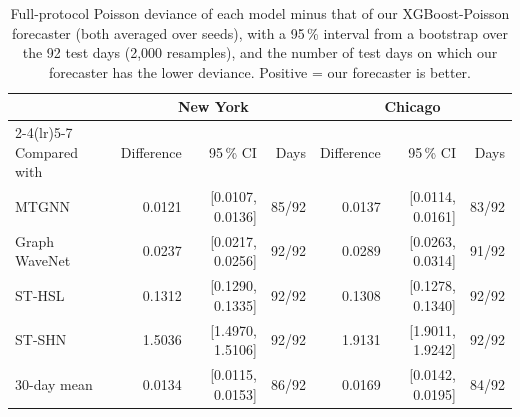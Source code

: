 \begin{table}[!htbp]\centering\small\setlength{\tabcolsep}{3.5pt}
\caption{Full-protocol Poisson deviance of each model minus that of our XGBoost-Poisson forecaster (both averaged over seeds), with a 95\,\% interval from a bootstrap over the 92 test days (2{,}000 resamples), and the number of test days on which our forecaster has the lower deviance. Positive = our forecaster is better.}\label{tab:bootstrap}
\begin{tabular}{lrrrrrr}\toprule
 & \multicolumn{3}{c}{New York} & \multicolumn{3}{c}{Chicago}\\\cmidrule(lr){2-4}\cmidrule(lr){5-7}
Compared with & Difference & 95\,\% CI & Days & Difference & 95\,\% CI & Days\\\midrule
MTGNN & 0.0121 & [0.0107, 0.0136] & 85/92 & 0.0137 & [0.0114, 0.0161] & 83/92 \\
Graph WaveNet & 0.0237 & [0.0217, 0.0256] & 92/92 & 0.0289 & [0.0263, 0.0314] & 91/92 \\
ST-HSL & 0.1312 & [0.1290, 0.1335] & 92/92 & 0.1308 & [0.1278, 0.1340] & 92/92 \\
ST-SHN & 1.5036 & [1.4970, 1.5106] & 92/92 & 1.9131 & [1.9011, 1.9242] & 92/92 \\
30-day mean & 0.0134 & [0.0115, 0.0153] & 86/92 & 0.0169 & [0.0142, 0.0195] & 84/92 \\
\bottomrule\end{tabular}\end{table}
